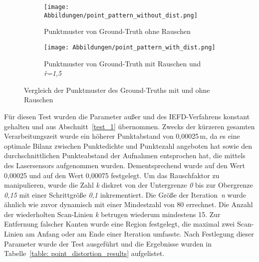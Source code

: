 \begin{figure}[b]
	\centering
	\begin{subfigure}{0.49\textwidth}
		\texttt{[image: Abbildungen/point\_pattern\_without\_dist.png]}
		\centering
		\caption{Punktmuster von Ground-Truth ohne Rauschen}
		\label{fig: point_pattern_without_dist}
	\end{subfigure}
	\hfill
	\begin{subfigure}{0.49\textwidth}
		\texttt{[image: Abbildungen/point\_pattern\_with\_dist.png]}
		\centering
		\caption{Punktmuster von Ground-Truth mit Rauschen und \textit{\^{r}=1,5}}
		\label{fig: point_patter_with_dist}
	\end{subfigure}
	\caption[Effekt des Rauschens auf die Ground-Truth Datei]{Vergleich der Punktmuster des Ground-Truths mit und ohne Rauschen}
	\label{fig: point_pattern_comparision}
\end{figure}

Für diesen Test wurden die Parameter außer \distthresha und \distthreshb des IEFD-Verfahrens konstant gehalten und aus Abschnitt~\ref{test_1} übernommen. Zwecks der kürzeren gesamten Verarbeitungszeit wurde ein höherer Punktabstand von 0,00025\,\si{\m}, da es eine optimale Bilanz zwischen Punktedichte und Punktezahl angeboten hat sowie den durchschnittlichen Punkteabstand der Aufnahmen entsprochen hat, die mittels des Lasersensors aufgenommen wurden. Dementsprechend wurde \distthresha auf den Wert 0,00025 und \distthreshb auf den Wert 0,00075 festgelegt. Um das Rauschfaktor zu manipulieren, wurde die Zahl \textit{k} diskret von der Untergrenze \textit{0} bis zur Obergrenze \textit{0,15} mit einer Schrittgröße \textit{0,1} inkrementiert. Die Größe der Iteration~\textit{n} wurde ähnlich wie zuvor dynamisch mit einer Mindestzahl von 80 errechnet. Die Anzahl der wiederholten Scan-Linien \textit{k} betrugen wiederum mindestens 15. Zur Entfernung falscher Kanten wurde eine Region festgelegt, die maximal zwei Scan-Linien am Anfang oder am Ende einer Iteration umfasste. Nach Festlegung dieser Parameter wurde der Test ausgeführt und die Ergebnisse wurden in Tabelle~\ref{table: point_distortion_results} aufgelistet.

